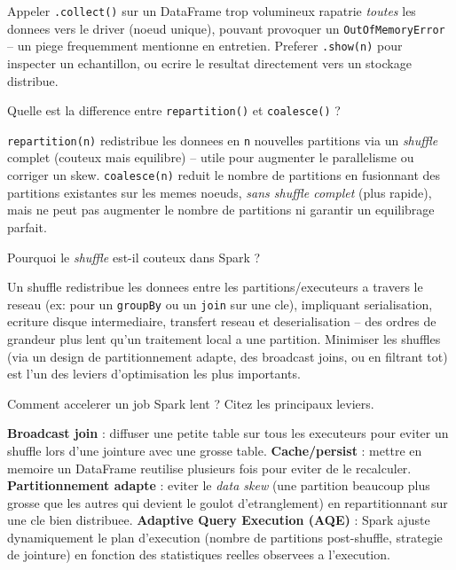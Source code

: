 \documentclass[11pt,a4paper]{article}
\begin{document}
\begin{piege}
Appeler \texttt{.collect()} sur un DataFrame trop volumineux rapatrie \emph{toutes} les donnees vers le driver (noeud unique), pouvant provoquer un \texttt{OutOfMemoryError} -- un piege frequemment mentionne en entretien. Preferer \texttt{.show(n)} pour inspecter un echantillon, ou ecrire le resultat directement vers un stockage distribue.
\end{piege}

\begin{question} Quelle est la difference entre \texttt{repartition()} et \texttt{coalesce()} ?
\end{question}
\begin{reponse}
\texttt{repartition(n)} redistribue les donnees en \texttt{n} nouvelles partitions via un \emph{shuffle} complet (couteux mais equilibre) -- utile pour augmenter le parallelisme ou corriger un skew. \texttt{coalesce(n)} reduit le nombre de partitions en fusionnant des partitions existantes sur les memes noeuds, \emph{sans shuffle complet} (plus rapide), mais ne peut pas augmenter le nombre de partitions ni garantir un equilibrage parfait.
\end{reponse}

\begin{question} Pourquoi le \emph{shuffle} est-il couteux dans Spark ?
\end{question}
\begin{reponse}
Un shuffle redistribue les donnees entre les partitions/executeurs a travers le reseau (ex: pour un \texttt{groupBy} ou un \texttt{join} sur une cle), impliquant serialisation, ecriture disque intermediaire, transfert reseau et deserialisation -- des ordres de grandeur plus lent qu'un traitement local a une partition. Minimiser les shuffles (via un design de partitionnement adapte, des broadcast joins, ou en filtrant tot) est l'un des leviers d'optimisation les plus importants.
\end{reponse}

\begin{question} Comment accelerer un job Spark lent ? Citez les principaux leviers.
\end{question}
\begin{reponse}
\textbf{Broadcast join} : diffuser une petite table sur tous les executeurs pour eviter un shuffle lors d'une jointure avec une grosse table. \textbf{Cache/persist} : mettre en memoire un DataFrame reutilise plusieurs fois pour eviter de le recalculer. \textbf{Partitionnement adapte} : eviter le \emph{data skew} (une partition beaucoup plus grosse que les autres qui devient le goulot d'etranglement) en repartitionnant sur une cle bien distribuee. \textbf{Adaptive Query Execution (AQE)} : Spark ajuste dynamiquement le plan d'execution (nombre de partitions post-shuffle, strategie de jointure) en fonction des statistiques reelles observees a l'execution.
\end{reponse}
\end{document}
